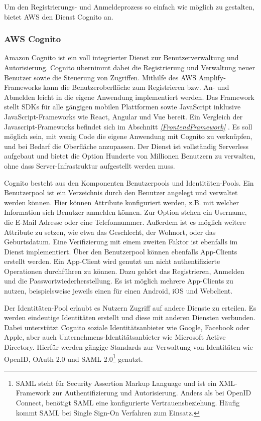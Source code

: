 {Um den Registrierungs- und Anmeldeprozess so einfach wie möglich zu gestalten, bietet AWS den Dienst Cognito an.

\subsubsection{AWS Cognito}
\label{Cognito}
Amazon Cognito ist ein voll integrierter Dienst zur Benutzerverwaltung und Autorisierung.
Cognito übernimmt dabei die Registrierung und Verwaltung neuer Benutzer sowie die Steuerung von Zugriffen.
Mithilfe des AWS Amplify-Frameworks kann die Benutzeroberfläche zum Registrieren bzw. An- und Abmelden leicht in die eigene Anwendung implementiert werden.
Das Framework stellt SDKs für alle gängigen mobilen Plattformen sowie JavaScript inklusive JavaScript-Frameworks wie React, Angular und Vue bereit.
Ein Vergleich der Javascript-Frameworks befindet sich im Abschnitt \textit{\ref{FrontendFramework} }.
Es soll möglich sein, mit wenig Code die eigene Anwendung mit Cognito zu verknüpfen, und bei Bedarf die Oberfläche anzupassen.
Der Dienst ist vollständig Serverless aufgebaut und bietet die Option \glqq Hunderte von Millionen Benutzern\grqq{} zu verwalten,
\glqq ohne dass Server-Infrastruktur aufgestellt werden muss.\grqq \cite{CognitoUebersicht} \cite{Cognito2}

Cognito besteht aus den Komponenten Benutzerpools und Identitäten-Pools.
Ein Benutzerpool ist ein Verzeichnis durch den Benutzer angelegt und verwaltet werden können.
Hier können Attribute konfiguriert werden, z.B. mit welcher Information sich Benutzer anmelden können.
Zur Option stehen ein Username, die E-Mail Adresse oder eine Telefonnummer.
Außerdem ist es möglich weitere Attribute zu setzen, wie etwa das Geschlecht, der Wohnort, oder das Geburtsdatum.
Eine Verifizierung mit einem zweiten Faktor ist ebenfalls im Dienst implementiert.
Über den Benutzerpool können ebenfalls App-Clients erstellt werden.
Ein App-Client wird genutzt um nicht authentifizierte Operationen durchführen zu können.
Dazu gehört das Registrieren, Anmelden und die Passwortwiederherstellung.
Es ist möglich mehrere App-Clients zu nutzen, beispielsweise jeweils einen für einen Android, iOS und Webclient.

Der Identitäten-Pool erlaubt es Nutzern Zugriff auf andere Dienste zu erteilen. Es werden eindeutige Identitäten erstellt und diese mit anderen Diensten verbunden.
Dabei unterstützt Cognito soziale Identitätsanbieter wie Google, Facebook oder Apple, aber auch Unternehmens-Identitätsanbieter wie Microsoft Active Directory.
Hierfür werden gängige Standards zur Verwaltung von Identitäten wie OpenID, OAuth 2.0 und SAML 2.0\footnote{SAML steht für Security Assertion Markup Language und ist ein XML-Framework zur  Authentifizierung und Autorisierung.
Anders als bei OpenID Connect, benötigt SAML eine konfigurierte Vertrauensbeziehung. Häufig kommt SAML bei Single Sign-On Verfahren zum Einsatz. } genutzt. \cite{Cognito1}

}
